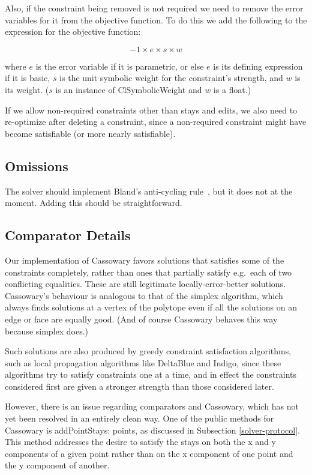 \documentclass{article}
\begin{document}
Also, if the constraint being removed is not required we need to remove the
error variables for it from the objective function.  To do this we add the
following to the expression for the objective function:

$$ -1 \times e \times s \times w $$

where $e$ is the error variable if it is parametric, or else $e$ is its
defining expression if it is basic, $s$ is the unit symbolic weight for the
constraint's strength, and $w$ is its weight.  ($s$ is an instance of 
{\sf ClSymbolicWeight} and $w$ is a float.)

If we allow non-required constraints other than stays and edits, we also
need to re-optimize after deleting a constraint, since a non-required
constraint might have become satisfiable (or more nearly satisfiable).

\subsection{Omissions}

The solver should implement Bland's anti-cycling
rule~\cite{marriott-stuckey-book}, but it does not at the moment.
Adding this should be straightforward.

\subsection{Comparator Details}  
\label{comparator-details}  

Our implementation of Cassowary favors solutions that satisfies some of the
constraints completely, rather than ones that partially satisfy e.g.\ each
of two conflicting equalities.  These are still legitimate
locally-error-better solutions.  Cassowary's behaviour is analogous to that
of the simplex algorithm, which always finds solutions at a vertex of the
polytope even if all the solutions on an edge or face are equally good.
(And of course Cassowary behaves this way because simplex does.)

Such solutions are also produced by greedy constraint satisfaction
algorithms, such as local propagation algorithms like DeltaBlue and Indigo,
since these algorithms try to satisfy constraints one at a time, and in
effect the constraints considered first are given a stronger strength than
those considered later.

However, there is an issue regarding comparators and Cassowary, which has
not yet been resolved in an entirely clean way.  One of the public methods
for Cassowary is {\sf addPointStays: points}, as discussed in Subsection
\ref{solver-protocol}.  This method addresses the desire to satisfy the
stays on both the {\sf x} and {\sf y} components of a given point rather
than on the {\sf x} component of one point and the {\sf y} component of
another.
\end{document}
